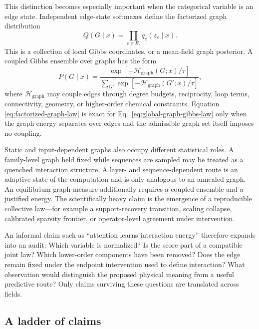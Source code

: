 \documentclass[10pt]{article}
\theoremstyle{definition}
\theoremstyle{remark}
\newcommand{\BookSection}[1]{\subsection{#1}}
\begin{document}
This distinction becomes especially important when the categorical variable is an edge state.
Independent edge-state softmaxes define the factorized graph distribution
\begin{equation}
Q(G\mid x)=\prod_{e\in E_c}q_e(z_e\mid x).
\label{eq:factorized-graph-law}
\end{equation}
This is a collection of local Gibbs coordinates, or a mean-field graph posterior.  A coupled Gibbs
ensemble over graphs has the form
\begin{equation}
P(G\mid x)
=\frac{\exp[-\mathcal H_{\mathrm{graph}}(G;x)/\tau]}
{\sum_{G'}\exp[-\mathcal H_{\mathrm{graph}}(G';x)/\tau]},
\label{eq:global-graph-gibbs-law}
\end{equation}
where $\mathcal H_{\mathrm{graph}}$ may couple edges through degree budgets, reciprocity, loop
terms, connectivity, geometry, or higher-order chemical constraints.  Equation
\ref{eq:factorized-graph-law} is exact for Eq.~\ref{eq:global-graph-gibbs-law} only when the graph
energy separates over edges and the admissible graph set itself imposes no coupling.

Static and input-dependent graphs also occupy different statistical roles.  A family-level graph
held fixed while sequences are sampled may be treated as a quenched interaction structure.  A
layer- and sequence-dependent route is an adaptive state of the computation and is only
analogous to an annealed graph.  An equilibrium graph measure additionally requires a coupled
ensemble and a justified energy.  The scientifically heavy claim is the emergence of a
reproducible collective law---for example a support-recovery transition, scaling
collapse, calibrated sparsity frontier, or operator-level agreement under intervention.

An informal claim such as ``attention learns interaction energy'' therefore expands into an audit:
Which variable is normalized?  Is the score part of a compatible joint law?  Which lower-order
components have been removed?  Does the edge remain fixed under the endpoint intervention used to
define interaction?  What observation would distinguish the proposed physical meaning from a
useful predictive route?  Only claims surviving these questions are translated across fields.

\BookSection{A ladder of claims}
\end{document}
